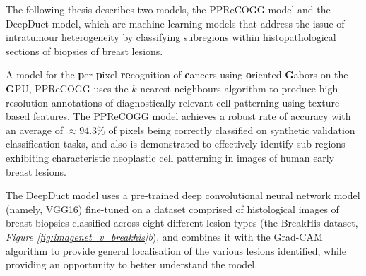 The following thesis describes two models, the PPReCOGG model and the DeepDuct model, which are machine learning models that address the issue of intratumour heterogeneity by classifying subregions within histopathological sections of biopsies of breast lesions. 

A model for the \textbf{p}er-\textbf{p}ixel \textbf{re}cognition of \textbf{c}ancers using \textbf{o}riented \textbf{G}abors on the \textbf{G}PU, PPReCOGG uses the $k$-nearest neighbours algorithm to produce high-resolution annotations of diagnostically-relevant cell patterning using texture-based features. The PPReCOGG model achieves a robust rate of accuracy with an average of $\approx94.3\%$ of pixels being correctly classified on synthetic validation classification tasks, and also is demonstrated to effectively identify sub-regions exhibiting characteristic neoplastic cell patterning in images of human early breast lesions.

The DeepDuct model uses a pre-trained deep convolutional neural network model (namely, VGG16) fine-tuned on a dataset comprised of histological images of breast biopsies classified across eight different lesion types (the BreakHis dataset,  \textit{Figure \ref{fig:imagenet_v_breakhis}b}), and combines it with the Grad-CAM algorithm to provide general localisation of the various lesions identified, while providing an opportunity to better understand the model.
